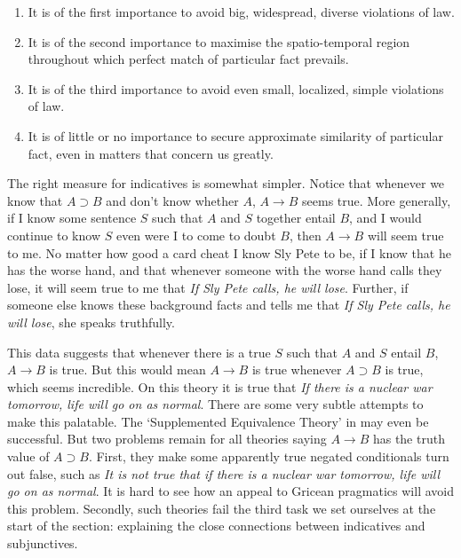 \begin{enumerate}
\item It is of the first importance to avoid big, widespread, diverse violations of law.
\item It is of the second importance to maximise the spatio-temporal region throughout which perfect match of particular fact prevails.
\item It is of the third importance to avoid even small, localized, simple violations of law.
\item It is of little or no importance to secure approximate similarity of particular fact, even in matters that concern us greatly. \citep[47-8]{Lewis1979c}
\end{enumerate}

\noindent The right measure for indicatives is somewhat simpler. Notice that whenever we know that \(A \supset B\) and don't know whether \(A\), \(A \rightarrow B\) seems true. More generally, if I know some sentence \(S\) such that \(A\) and \(S\) together entail \(B\), and I would continue to know \(S\) even were I to come to doubt \(B\), then \(A \rightarrow B\) will seem true to me. No matter how good a card cheat I know Sly Pete to be, if I know that he has the worse hand, and that whenever someone with the worse hand calls they lose, it will seem true to me that \textit{If Sly Pete calls, he will lose}. Further, if someone else knows these background facts and tells me that \textit{If Sly Pete calls, he will lose}, she speaks truthfully.

This data suggests that whenever there is a true \(S\) such that \(A\) and \(S\) entail \(B\), \(A \rightarrow B\) is true. But this would mean \(A \rightarrow B\) is true whenever \(A \supset B\) is true, which seems incredible. On this theory it is true that \textit{If there is a nuclear war tomorrow, life will go on as normal}. There are some very subtle attempts to make this palatable. The `Supplemented Equivalence Theory' in \citet{Jackson1987} may even be successful. But two problems remain for all theories saying \(A \rightarrow B\) has the truth value of \(A \supset B\). First, they make some apparently true negated conditionals turn out false, such as \textit{It is not true that if there is a nuclear war tomorrow, life will go on as normal}. It is hard to see how an appeal to Gricean pragmatics will avoid this problem. Secondly, such theories fail the third task we set ourselves at the start of the section: explaining the close connections between indicatives and subjunctives.

